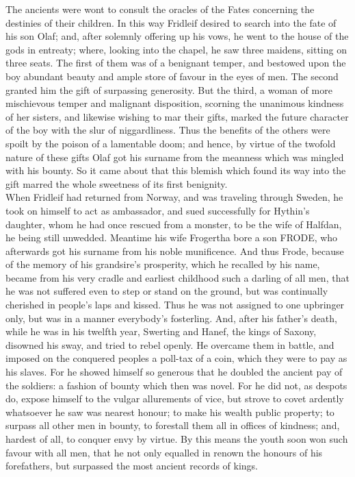 \documentclass[10pt,a4paper]{report}
\begin{document}
The ancients were wont to consult the oracles of the Fates concerning the destinies of their children. In this way Fridleif desired to search into the fate of his son Olaf; and, after solemnly offering up his vows, he went to the house of the gods in entreaty; where, looking into the chapel, he saw three maidens, sitting on three seats. The first of them was of a benignant temper, and bestowed upon the boy abundant beauty and ample store of favour in the eyes of men. The second granted him the gift of surpassing generosity. But the third, a woman of more mischievous temper and malignant disposition, scorning the unanimous kindness of her sisters, and likewise wishing to mar their gifts, marked the future character of the boy with the slur of niggardliness. Thus the benefits of the others were spoilt by the poison of a lamentable doom; and hence, by virtue of the twofold nature of these gifts Olaf got his surname from the meanness which was mingled with his bounty. So it came about that this blemish which found its way into the gift marred the whole sweetness of its first benignity.\\

When Fridleif had returned from Norway, and was traveling through Sweden, he took on himself to act as ambassador, and sued successfully for Hythin's daughter, whom he had once rescued from a monster, to be the wife of Halfdan, he being still unwedded. Meantime his wife Frogertha bore a son FRODE, who afterwards got his surname from his noble munificence. And thus Frode, because of the memory of his grandsire's prosperity, which he recalled by his name, became from his very cradle and earliest childhood such a darling of all men, that he was not suffered even to step or stand on the ground, but was continually cherished in people's laps and kissed. Thus he was not assigned to one upbringer only, but was in a manner everybody's fosterling. And, after his father's death, while he was in his twelfth year, Swerting and Hanef, the kings of Saxony, disowned his sway, and tried to rebel openly. He overcame them in battle, and imposed on the conquered peoples a poll-tax of a coin, which they were to pay as his slaves. For he showed himself so generous that he doubled the ancient pay of the soldiers: a fashion of bounty which then was novel. For he did not, as despots do, expose himself to the vulgar allurements of vice, but strove to covet ardently whatsoever he saw was nearest honour; to make his wealth public property; to surpass all other men in bounty, to forestall them all in offices of kindness; and, hardest of all, to conquer envy by virtue. By this means the youth soon won such favour with all men, that he not only equalled in renown the honours of his forefathers, but surpassed the most ancient records of kings.\\
\end{document}
